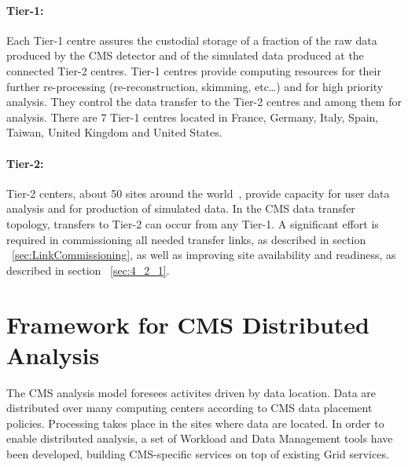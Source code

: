 \paragraph{Tier-1:} 
Each Tier-1 centre assures the custodial storage of a fraction of the raw data produced by the CMS detector and of the simulated data produced at the connected Tier-2 centres. Tier-1 centres provide computing resources for their further re-processing (re-reconstruction, skimming, etc…) and for high priority analysis.
They control the data transfer to the Tier-2 centres and among them for analysis.
There are 7 Tier-1 centres located in France, Germany, Italy, Spain, Taiwan, United Kingdom and United States.

\paragraph{Tier-2:}
Tier-2 centers, about 50 sites around the world~\cite{RefSite}, provide capacity for user data analysis and for production of simulated data.
In the CMS data transfer topology, transfers to Tier-2 can occur from any Tier-1.
A significant effort is required in commissioning all needed transfer links, as described in 
section ~\ref{sec:LinkCommissioning}, as well
as improving site availability and readiness, as described in section ~\ref{sec:4_2_1}.

\section{Framework for CMS Distributed Analysis}
\label{sec:3}
The CMS analysis model foresees activites driven by data location. Data are distributed over many computing centers according to CMS data placement policies. Processing takes place in the sites where data are located. In order to enable distributed analysis, a set of Workload and Data Management tools have been developed, building CMS-specific services on top of existing Grid services.

